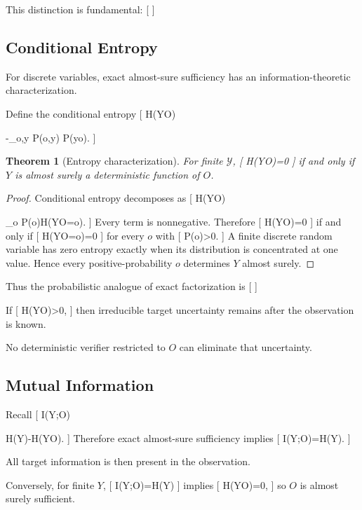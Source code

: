 \documentclass[11pt]{article}
\newtheorem{theorem}{Theorem} \newtheorem{proposition}{Proposition} \newtheorem{lemma}{Lemma} \newtheorem{corollary}{Corollary} \newtheorem{definition}{Definition} \newtheorem{remark}{Remark}
\begin{document}
This distinction is fundamental:
[
]

\subsection{Conditional Entropy}

For discrete variables, exact almost-sure sufficiency has an information-theoretic characterization.

Define the conditional entropy
[
H(Y\mid O)

-\sum_{o,y}
P(o,y)
\log P(y\mid o).
]

\begin{theorem}[Entropy characterization]
For finite $\mathcal Y$,
[
H(Y\mid O)=0
]
if and only if $Y$ is almost surely a deterministic function of $O$.
\end{theorem}

\begin{proof}
Conditional entropy decomposes as
[
H(Y\mid O)

\sum_o
P(o)H(Y\mid O=o).
]
Every term is nonnegative. Therefore
[
H(Y\mid O)=0
]
if and only if
[
H(Y\mid O=o)=0
]
for every $o$ with
[
P(o)>0.
]
A finite discrete random variable has zero entropy exactly when its distribution is concentrated at one value. Hence every positive-probability $o$ determines $Y$ almost surely.
\end{proof}

Thus the probabilistic analogue of exact factorization is
[
]

If
[
H(Y\mid O)>0,
]
then irreducible target uncertainty remains after the observation is known.

No deterministic verifier restricted to $O$ can eliminate that uncertainty.

\subsection{Mutual Information}

Recall
[
I(Y;O)

H(Y)-H(Y\mid O).
]
Therefore exact almost-sure sufficiency implies
[
I(Y;O)=H(Y).
]

All target information is then present in the observation.

Conversely, for finite $Y$,
[
I(Y;O)=H(Y)
]
implies
[
H(Y\mid O)=0,
]
so $O$ is almost surely sufficient.
\end{document}
